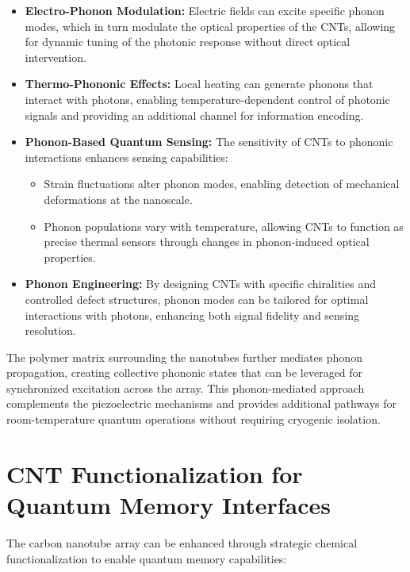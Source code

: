 \documentclass[11pt]{article}
\begin{document}
	\begin{itemize}
		\item \textbf{Electro-Phonon Modulation:} Electric fields can excite specific phonon modes, which in turn modulate the optical properties of the CNTs, allowing for dynamic tuning of the photonic response without direct optical intervention.
		
		\item \textbf{Thermo-Phononic Effects:} Local heating can generate phonons that interact with photons, enabling temperature-dependent control of photonic signals and providing an additional channel for information encoding.
		
		\item \textbf{Phonon-Based Quantum Sensing:} The sensitivity of CNTs to phononic interactions enhances sensing capabilities:
		\begin{itemize}
			\item Strain fluctuations alter phonon modes, enabling detection of mechanical deformations at the nanoscale.
			\item Phonon populations vary with temperature, allowing CNTs to function as precise thermal sensors through changes in phonon-induced optical properties.
		\end{itemize}
		
		\item \textbf{Phonon Engineering:} By designing CNTs with specific chiralities and controlled defect structures, phonon modes can be tailored for optimal interactions with photons, enhancing both signal fidelity and sensing resolution.
	\end{itemize}
	
	The polymer matrix surrounding the nanotubes further mediates phonon propagation, creating collective phononic states that can be leveraged for synchronized excitation across the array. This phonon-mediated approach complements the piezoelectric mechanisms and provides additional pathways for room-temperature quantum operations without requiring cryogenic isolation.
	
	\section{CNT Functionalization for Quantum Memory Interfaces}
	The carbon nanotube array can be enhanced through strategic chemical functionalization to enable quantum memory capabilities:
	
\end{document}
